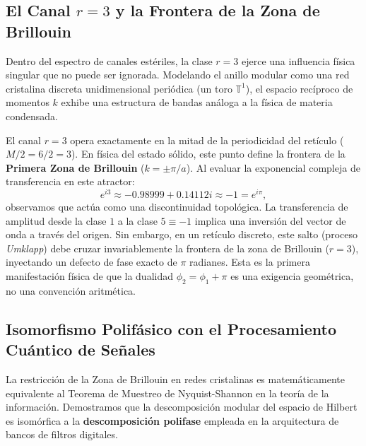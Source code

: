 \documentclass[12pt,a4paper]{article}
\theoremstyle{plain}
\theoremstyle{definition}
\theoremstyle{remark}
\begin{document}
\subsection{El Canal $r=3$ y la Frontera de la Zona de Brillouin}

Dentro del espectro de canales estériles, la clase $r=3$ ejerce una influencia física singular que no puede ser ignorada. Modelando el anillo modular como una red cristalina discreta unidimensional periódica (un toro $\mathbb{T}^1$), el espacio recíproco de momentos $k$ exhibe una estructura de bandas análoga a la física de materia condensada.

El canal $r=3$ opera exactamente en la mitad de la periodicidad del retículo ($M/2 = 6/2 = 3$). En física del estado sólido, este punto define la frontera de la \textbf{Primera Zona de Brillouin} ($k = \pm \pi/a$). Al evaluar la exponencial compleja de transferencia en este atractor:
\begin{equation}
e^{i3} \approx -0.98999 + 0.14112i \approx -1 = e^{i\pi},
\end{equation}
observamos que actúa como una discontinuidad topológica. La transferencia de amplitud desde la clase $1$ a la clase $5 \equiv -1$ implica una inversión del vector de onda a través del origen. Sin embargo, en un retículo discreto, este salto (proceso \textit{Umklapp}) debe cruzar invariablemente la frontera de la zona de Brillouin ($r=3$), inyectando un defecto de fase exacto de $\pi$ radianes. Esta es la primera manifestación física de que la dualidad $\phi_2 = \phi_1 + \pi$ es una exigencia geométrica, no una convención aritmética.

\subsection{Isomorfismo Polifásico con el Procesamiento Cuántico de Señales}

La restricción de la Zona de Brillouin en redes cristalinas es matemáticamente equivalente al Teorema de Muestreo de Nyquist-Shannon en la teoría de la información. Demostramos que la descomposición modular del espacio de Hilbert es isomórfica a la \textbf{descomposición polifase} empleada en la arquitectura de bancos de filtros digitales.
\end{document}
